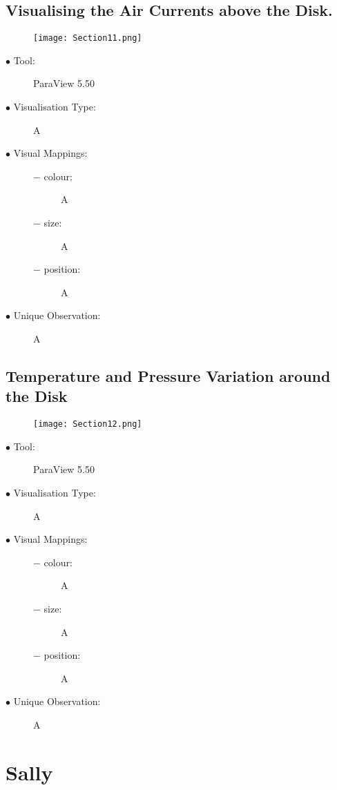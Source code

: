 \documentclass{article}
\begin{document}
\subsection{Visualising the Air Currents above the Disk.}
\begin{figure}[h]
	\centering
	\texttt{[image: Section11.png]}
\end{figure}
\begin{description}
	\item[$\bullet$ Tool:] ParaView 5.50
	\item[$\bullet$ Visualisation Type:] A
	\item[$\bullet$ Visual Mappings:] \hfill
		\begin{description}
			\item[$-$ colour:] A
			\item[$-$ size:] A
			\item[$-$ position:] A
		\end{description}
	\item[$\bullet$ Unique Observation:] A
\end{description}
\newpage

\subsection{Temperature and Pressure Variation around the Disk}
\begin{figure}[h]
	\centering
	\texttt{[image: Section12.png]}
\end{figure}
\begin{description}
	\item[$\bullet$ Tool:] ParaView 5.50
	\item[$\bullet$ Visualisation Type:] A
	\item[$\bullet$ Visual Mappings:] \hfill
		\begin{description}
			\item[$-$ colour:] A
			\item[$-$ size:] A
			\item[$-$ position:] A
		\end{description}
	\item[$\bullet$ Unique Observation:] A
\end{description}
\newpage

\section{Sally}
\end{document}
